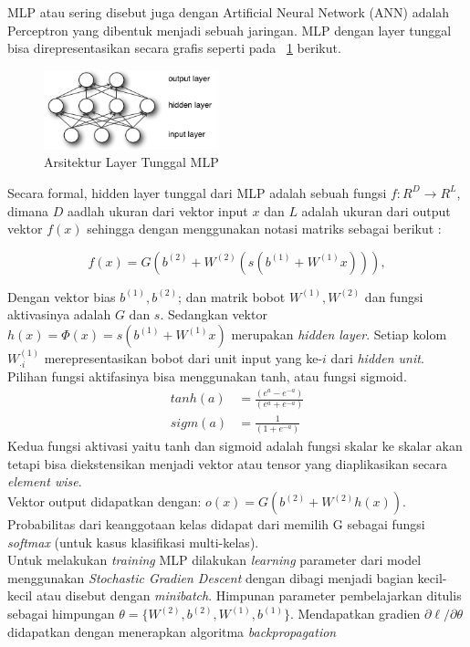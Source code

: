 MLP atau sering disebut juga dengan Artificial Neural Network (ANN) adalah Perceptron yang dibentuk menjadi sebuah jaringan. MLP dengan layer tunggal bisa direpresentasikan secara grafis seperti pada  \pic~\ref{fig:mlp} berikut.

\begin{figure}
	\centering
	\includegraphics[width=0.45\textwidth]
		{pics/mlp.png}
	\caption{Arsitektur Layer Tunggal MLP}
	\label{fig:mlp}
\end{figure}

Secara formal, hidden layer tunggal dari MLP adalah sebuah fungsi $f: R^D \rightarrow R^L$, dimana $D$ aadlah ukuran dari vektor input $x$ dan $L$ adalah ukuran dari output vektor $f(x)$ sehingga dengan menggunakan notasi matriks sebagai berikut :

\begin{equation}
f(x) = G( b^{(2)} + W^{(2)}( s( b^{(1)} + W^{(1)} x))),
\end{equation}

Dengan vektor bias $b^{(1)}, b^{(2)}$; dan matrik bobot $W^{(1)}, W^{(2)}$ dan fungsi aktivasinya adalah $G$ dan $s$. Sedangkan vektor $h(x) = \Phi(x) = s(b^{(1)} + W^{(1)} x)$ merupakan \textit{hidden layer}. Setiap kolom $W^{(1)}_{\cdot i}$ merepresentasikan bobot dari unit input yang ke-$i$ dari \textit{hidden unit}. Pilihan fungsi aktifasinya bisa menggunakan tanh, atau fungsi sigmoid.
\begin{equation}
\begin{aligned}
tanh(a)&= \frac{(e^a-e^{-a})}{(e^a+e^{-a})} \\
sigm(a)&=\frac{1}{(1+e^{-a})}
\end{aligned}
\end{equation}
Kedua fungsi aktivasi yaitu tanh dan sigmoid adalah fungsi skalar ke skalar akan tetapi bisa diekstensikan menjadi vektor atau tensor yang diaplikasikan secara \textit{element wise}.\\
Vektor output didapatkan dengan: $o(x) = G(b^{(2)} + W^{(2)} h(x))$. Probabilitas dari keanggotaan kelas didapat dari memilih G sebagai fungsi \textit{softmax} (untuk kasus klasifikasi multi-kelas).\\
Untuk melakukan \textit{training} MLP dilakukan \textit{learning} parameter dari model menggunakan \textit{Stochastic Gradien Descent} dengan dibagi menjadi bagian kecil-kecil atau disebut dengan \textit{minibatch}. Himpunan parameter pembelajarkan ditulis sebagai himpungan $\theta = \{W^{(2)},b^{(2)},W^{(1)},b^{(1)}\}$. Mendapatkan gradien $\partial{\ell}/\partial{\theta}$ didapatkan dengan menerapkan algoritma \textit{backpropagation} \citep{tutorial2014lisa}

